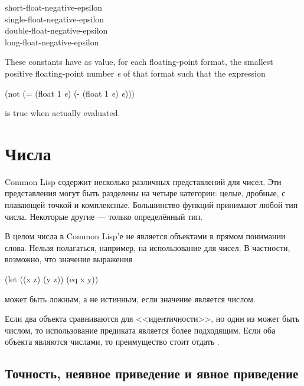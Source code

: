 \begin{defun}[Constant]
short-float-negative-epsilon \\
single-float-negative-epsilon \\
double-float-negative-epsilon \\
long-float-negative-epsilon

These constants have as value, for each floating-point format,
the smallest positive floating-point number \emph{e} of that format such that
the expression
\begin{lisp}
(not (= (float 1 \emph{e}) (- (float 1 \emph{e}) \emph{e})))
\end{lisp}
is true when actually evaluated.
\end{defun}

\else %

\chapter{Числа}
\label{NUMBER}

Common Lisp содержит несколько различных представлений для чисел.
Эти представления могут быть разделены на четыре категории: целые, дробные, с
плавающей точкой и комплексные. Большинство функций принимают любой тип
числа. Некоторые другие --- только определённый тип.

В целом числа в Common Lisp'е не является объектами в прямом понимании
слова. Нельзя полагаться, например, на использование  для чисел. В
частности, возможно, что значение выражения
\begin{lisp}
(let ((x z) (y z)) (eq x y))
\end{lisp}
может быть ложным, а не истинным, если значение  является числом.

Если два объекта сравниваются для <<идентичности>>, но один из может быть
числом, то использование предиката  является более подходящим.
Если оба объекта являются числами, то преимущество стоит отдать \cdf{=}.

\section{Точность, неявное приведение и явное приведение}
\label{PRECISION-CONTAGION-COERCION-SECTION}

